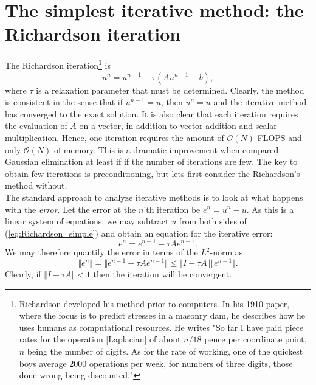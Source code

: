 \section{The simplest iterative method: the Richardson iteration}
The Richardson iteration\footnote{
Richardson developed his method prior to computers. 
In his 1910 paper, where the focus is to predict stresses in a masonry dam, he 
describes how he uses humans as computational resources.  
He writes "So far I have paid piece rates for
the operation [Laplacian] of about $n/18$ pence per coordinate point, $n$
being the number of digits. As for the rate of working, one of the quickest 
boys average 2000 operations per week, for numbers of three digits, those
done wrong being discounted."}    is  
\begin{equation}
\label{eq:Richardson_simple}
u^n = u^{n-1} - \tau (A u^{n-1} - b),
\end{equation}
where $\tau$ is a relaxation parameter that must be determined.
Clearly, the method is consistent in the sense that  
if $u^{n-1} = u$, then $u^{n} = u$ and the iterative method has converged to 
the exact solution. It is also clear that each iteration requires the evaluation of $A$ on a vector, in 
addition to vector addition and scalar multiplication. Hence, one iteration requires
the amount of  $\mathcal{O}(N)$ FLOPS and only $\mathcal{O}(N)$ 
of memory. This is a dramatic improvement when compared Gaussian elimination at least if  
if the number of iterations are few. The key to obtain few iterations is 
preconditioning, but lets first consider the Richardson's method without.     
\\

The standard approach to analyze iterative methods is to look at what happens with the \textit{error}.
Let the error at the $n$'th iteration be  
$e^n = u^n -u$. As this is a linear system of equations, we may subtract $u$ from both sides of (\ref{eq:Richardson_simple}) 
and obtain an equation for the iterative error: 
\[
e^n = e^{n-1} - \tau A e^{n-1} .
\]
We may therefore quantify the error in terms of the $L^2$-norm as
\[
\Vert e^n \Vert = \Vert e^{n-1} - \tau A e^{n-1} \Vert \le \Vert I - \tau A \Vert \Vert e^{n-1}\Vert .  
\]
Clearly, if $\Vert I - \tau A \Vert < 1$ then the iteration will be convergent. 
\\

